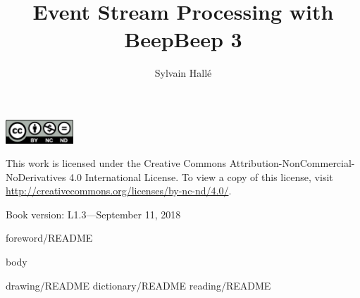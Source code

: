 \documentclass{lifmanual}
\title{Event Stream Processing with BeepBeep 3}
\author{Sylvain Hallé}
\begin{document}
\frontmatter

\newpage

\cleardoublepage

\newpage

\thispagestyle{empty}
\pagestyle{empty}
\rule{0in}{6in}
\noindent
\includegraphics[width=1in]{by-nc-nd}\\
{\sf\small
\noindent
This work is licensed under the Creative Commons Attribution-NonCommercial-NoDerivatives 4.0 International License. To view a copy of this license, visit \url{http://creativecommons.org/licenses/by-nc-nd/4.0/}.\\

\noindent
\rule{0in}{8pt}
\noindent
Book version: L1.3---September 11, 2018}


\pagestyle{toc}
\tableofcontents
\newpage
{foreword/README}

\mainmatter
\thispagestyle{normal}
\pagestyle{normal}

{body}

\appendix
\renewcommand{\chaptername}{Appendix}
{drawing/README}
{dictionary/README}
{reading/README}

\pagestyle{index}
\printindex

\cleardoublepage
\thispagestyle{empty}
\phantom{W}
\newpage

\end{document}
